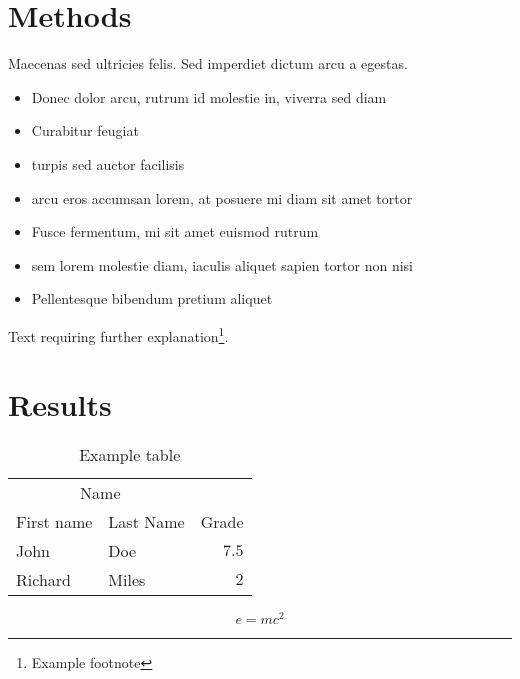 \documentclass[twoside,twocolumn]{article}
\begin{document}

\section{Methods}

Maecenas sed ultricies felis. Sed imperdiet dictum arcu a egestas. 
\begin{itemize}
\item Donec dolor arcu, rutrum id molestie in, viverra sed diam
\item Curabitur feugiat
\item turpis sed auctor facilisis
\item arcu eros accumsan lorem, at posuere mi diam sit amet tortor
\item Fusce fermentum, mi sit amet euismod rutrum
\item sem lorem molestie diam, iaculis aliquet sapien tortor non nisi
\item Pellentesque bibendum pretium aliquet
\end{itemize}
\blindtext %

Text requiring further explanation\footnote{Example footnote}.


\section{Results}

\begin{table}
\caption{Example table}
\centering
\begin{tabular}{llr}
\toprule
\multicolumn{2}{c}{Name} \\
\cmidrule(r){1-2}
First name & Last Name & Grade \\
\midrule
John & Doe & $7.5$ \\
Richard & Miles & $2$ \\
\bottomrule
\end{tabular}
\end{table}

\blindtext %

\begin{equation}
\label{eq:emc}
e = mc^2
\end{equation}

\blindtext %

\end{document}
